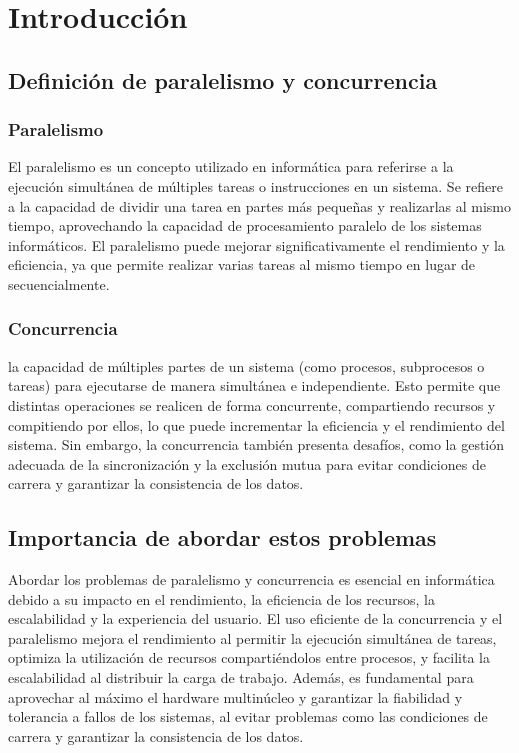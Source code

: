 \documentclass[12pt,a4paper]{article}
\begin{document}

\pagestyle{fancy} \mystyle \newpage %

\section{Introducción}
\subsection{Definición de paralelismo y concurrencia}
\subsubsection*{Paralelismo} El paralelismo es un concepto utilizado en informática para referirse a la ejecución simultánea de múltiples tareas o instrucciones en un sistema. Se refiere a la capacidad de dividir una tarea en partes más pequeñas y realizarlas al mismo tiempo, aprovechando la capacidad de procesamiento paralelo de los sistemas informáticos. El paralelismo puede mejorar significativamente el rendimiento y la eficiencia, ya que permite realizar varias tareas al mismo tiempo en lugar de secuencialmente.
\subsubsection*{Concurrencia} la capacidad de múltiples partes de un sistema (como procesos, subprocesos o tareas) para ejecutarse de manera simultánea e independiente. Esto permite que distintas operaciones se realicen de forma concurrente, compartiendo recursos y compitiendo por ellos, lo que puede incrementar la eficiencia y el rendimiento del sistema. Sin embargo, la concurrencia también presenta desafíos, como la gestión adecuada de la sincronización y la exclusión mutua para evitar condiciones de carrera y garantizar la consistencia de los datos.

\subsection{Importancia de abordar estos problemas}
Abordar los problemas de paralelismo y concurrencia es esencial en informática debido a su impacto en el rendimiento, la eficiencia de los recursos, la escalabilidad y la experiencia del usuario. El uso eficiente de la concurrencia y el paralelismo mejora el rendimiento al permitir la ejecución simultánea de tareas, optimiza la utilización de recursos compartiéndolos entre procesos, y facilita la escalabilidad al distribuir la carga de trabajo. Además, es fundamental para aprovechar al máximo el hardware multinúcleo y garantizar la fiabilidad y tolerancia a fallos de los sistemas, al evitar problemas como las condiciones de carrera y garantizar la consistencia de los datos.
\end{document}
